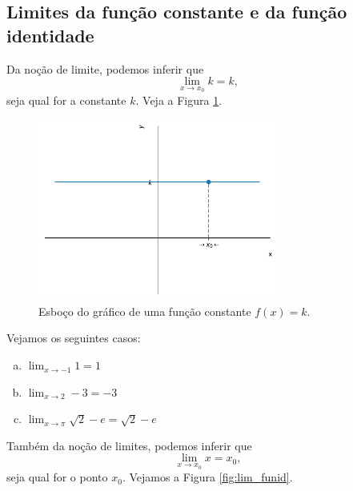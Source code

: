 \subsection{Limites da função constante e da função identidade}

Da noção de limite, podemos inferir que
\begin{equation}
  \lim_{x\to x_0} k = k,
\end{equation}
seja qual for a constante $k$. Veja a Figura \ref{fig:lim_funk}.

\begin{figure}[H]
  \centering
  \includegraphics[width=0.7\textwidth]{./cap_lim/dados/fig_lim_funk/fig_lim_funk}
  \caption{Esboço do gráfico de uma função constante $f(x) = k$.}
  \label{fig:lim_funk}
\end{figure}

\begin{ex}
  Vejamos os seguintes casos:
  \begin{enumerate}[a)]
  \item $\displaystyle \lim_{x\to -1} 1 = 1$
  \item $\displaystyle \lim_{x\to 2} -3 = -3$
  \item $\displaystyle \lim_{x\to \pi} \sqrt{2}-e = \sqrt{2}-e$
  \end{enumerate}
\end{ex}

Também da noção de limites, podemos inferir que
\begin{equation}
  \lim_{x\to x_0} x = x_0,
\end{equation}
seja qual for o ponto $x_0$. Vejamos a Figura \ref{fig:lim_funid}.

